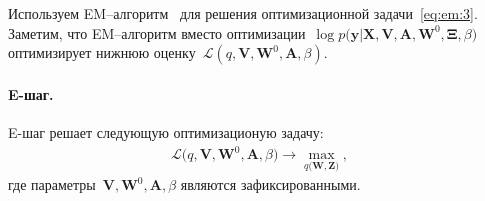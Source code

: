 Используем EM--алгоритм~\cite{Dempster1977, bishop2006} для решения оптимизационной задачи~\eqref{eq:em:3}. Заметим, что EM--алгоритм вместо оптимизации~$\log p\bigr(\mathbf{y}|\mathbf{X}, \mathbf{V}, \textbf{A}, \textbf{W}^{0}, \bm{\Xi}, \beta\bigr)$ оптимизирует нижнюю оценку~$\mathcal{L}\left(q, \textbf{V}, \textbf{W}^{0}, \textbf{A}, \beta\right)$.


\paragraph{E-шаг.} E-шаг решает следующую оптимизационую задачу:
\[
\label{eq:em:new:3}
\begin{aligned}
\mathcal{L}\bigr(q, \textbf{V}, \textbf{W}^{0}, \textbf{A}, \beta\bigr) \to \max_{q\bigr(\textbf{W}, \textbf{Z}\bigr)},
\end{aligned}
\]
где параметры~$\textbf{V}, \textbf{W}^{0}, \textbf{A}, \beta$ являются зафиксированными.

